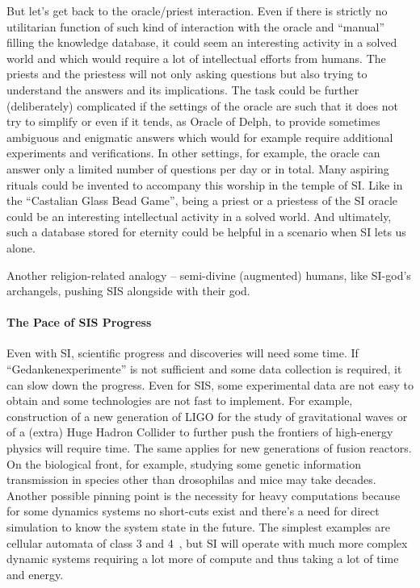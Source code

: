 \documentclass[a4paper,11pt]{article}
\begin{document}
But let's get back to the oracle/priest interaction. Even if there is strictly no utilitarian function of such kind of interaction with the oracle and ``manual'' filling the knowledge database, it could seem an interesting activity in a solved world and which would require a lot of intellectual efforts from humans. The priests and the priestess will not only asking questions but also trying to understand the answers and its implications. The task could be further (deliberately) complicated if the settings of the oracle are such that it does not try to simplify or even if it tends, as Oracle of Delph, to provide sometimes ambiguous and enigmatic answers which would for example require additional experiments and verifications. In other settings, for example, the oracle can answer only a limited number of questions per day or in total. Many aspiring rituals could be invented to accompany this worship in the temple of SI. Like in the ``Castalian Glass Bead Game'', being a priest or a priestess of the SI oracle could be an interesting intellectual activity in a solved world. And ultimately, such a database stored for eternity could be helpful in a scenario when SI lets us alone.

Another religion-related analogy -- semi-divine (augmented) humans, like SI-god's archangels, pushing SIS alongside with their god.

\paragraph{The Pace of SIS Progress}
Even with SI, scientific progress and discoveries will need some time. If ``Gedankenexperimente'' is not sufficient and some data collection is required, it can slow down the progress. Even for SIS, some experimental data are not easy to obtain and some technologies are not fast to implement. For example, construction of a new generation of LIGO for the study of gravitational waves  or of a (extra) Huge Hadron Collider to further push the frontiers of high-energy physics will require time. The same applies for new generations of fusion reactors. On the biological front, for example, studying some genetic information transmission in species other than drosophilas and mice may take decades. Another possible pinning point is the necessity for heavy computations because for some dynamics systems no short-cuts exist and there's a need for direct simulation to know the system state in the future. The simplest examples are cellular automata of class 3 and 4~\parencite{Wolfram1984CA}, but SI will operate with much more complex dynamic systems requiring a lot more of compute and thus taking a lot of time and energy.
\end{document}
